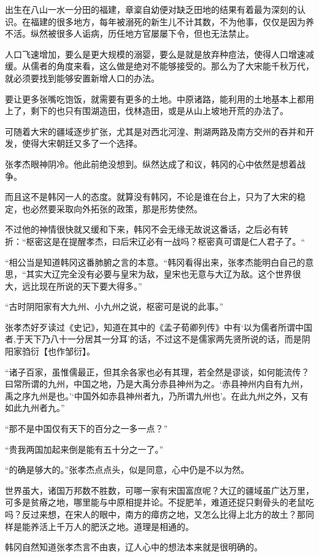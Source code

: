 出生在八山一水一分田的福建，章楶自幼便对缺乏田地的结果有着最为深刻的认识。在福建的很多地方，每年被溺死的新生儿不计其数，不为他事，仅仅是因为养不活。纵然被很多人诟病，历任地方官屡屡下令，但也无法禁止。

人口飞速增加，要么是更大规模的溺婴，要么是就是放弃种痘法，使得人口增速减缓。从儒者的角度来看，这么做是绝对不能够接受的。那么为了大宋能千秋万代，就必须要找到能够安置新增人口的办法。

要让更多张嘴吃饱饭，就需要有更多的土地。中原诸路，能利用的土地基本上都用上了，剩下的也只有围湖造田，伐林造田，或是从山上坡地开荒的办法了。

可随着大宋的疆域逐步扩张，尤其是对西北河湟、荆湖两路及南方交州的吞并和开发，使得大宋朝廷又多了一个选择。

张孝杰眼神阴冷。他此前绝没想到。纵然达成了和议，韩冈的心中依然是想着战争。

而且这不是韩冈一人的态度。就算没有韩冈，不论是谁在台上，只为了大宋的稳定，也必然要采取向外拓张的政策，那是形势使然。

不过他的神情很快就又缓和下来，韩冈不会无缘无故说这番话，之后必有转折：“枢密这是在提醒孝杰，曰后宋辽必有一战吗？枢密真可谓是仁人君子了。“

“相公当是知道韩冈这番肺腑之言的本意。“韩冈看得出来，张孝杰能明白自己的意思，“其实大辽完全没有必要与皇宋为敌，皇宋也无意与大辽为敌。这个世界很大，远比现在所说的天下要大得多。”

“古时阴阳家有大九州、小九州之说，枢密可是说的此事。”

张孝杰好歹读过《史记》，知道在其中的《孟子荀卿列传》中有‘以为儒者所谓中国者,于天下乃八十一分居其一分耳’的话，不过这不是儒家两先贤所说的话，而是阴阳家驺衍【也作邹衍】。

“诸子百家，虽惟儒最正，但其余各家也必有其理，若全然是谬谈，如何能流传？曰常所谓的九州，中国之地，乃是大禹分赤县神州为之。‘赤县神州内自有九州，禹之序九州是也。’‘中国外如赤县神州者九，乃所谓九州也’。在此九州之外，又有如此九州者九。”

“那不是中国仅有天下的百分之一多一点？”

“贵我两国加起来倒是能有五十分之一了。”

“的确是够大的。”张孝杰点点头，似是同意，心中仍是不以为然。

世界虽大，诸国万邦数不胜数，可哪一家有宋国富庶呢？大辽的疆域虽广达万里，可多是贫瘠之地，哪里能与中原相提并论。不捉肥羊，难道还捉只剩骨头的老鼠吃吗？反过来想，在宋人的眼中，南方的瘴疠之地，又怎么比得上北方的故土？那同样是能养活上千万人的肥沃之地。道理是相通的。

韩冈自然知道张孝杰言不由衷，辽人心中的想法本来就是很明确的。

